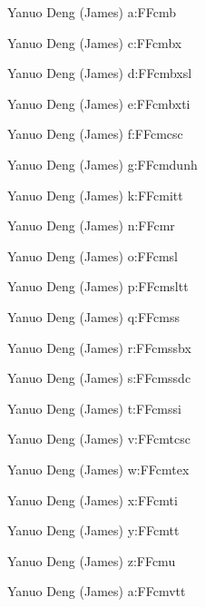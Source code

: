 \par \FFcmb      Yanuo Deng (James)  a:FFcmb    
\par \FFcmbx     Yanuo Deng (James)  c:FFcmbx   
\par \FFcmbxsl   Yanuo Deng (James)  d:FFcmbxsl 
\par \FFcmbxti   Yanuo Deng (James)  e:FFcmbxti 
\par \FFcmcsc    Yanuo Deng (James)  f:FFcmcsc  
\par \FFcmdunh   Yanuo Deng (James)  g:FFcmdunh 
\par \FFcmitt    Yanuo Deng (James)  k:FFcmitt  
\par \FFcmr      Yanuo Deng (James)  n:FFcmr    
\par \FFcmsl     Yanuo Deng (James)  o:FFcmsl   
\par \FFcmsltt   Yanuo Deng (James)  p:FFcmsltt 
\par \FFcmss     Yanuo Deng (James)  q:FFcmss   
\par \FFcmssbx   Yanuo Deng (James)  r:FFcmssbx 
\par \FFcmssdc   Yanuo Deng (James)  s:FFcmssdc 
\par \FFcmssi    Yanuo Deng (James)  t:FFcmssi  
\par \FFcmtcsc   Yanuo Deng (James)  v:FFcmtcsc 
\par \FFcmtex    Yanuo Deng (James)  w:FFcmtex  
\par \FFcmti     Yanuo Deng (James)  x:FFcmti   
\par \FFcmtt     Yanuo Deng (James)  y:FFcmtt   
\par \FFcmu      Yanuo Deng (James)  z:FFcmu    
\par \FFcmvtt    Yanuo Deng (James)  a:FFcmvtt  

\bye
